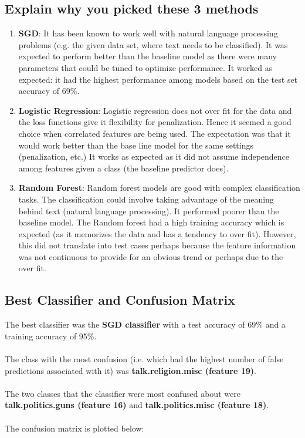 \documentclass[10pt]{article}
\begin{document}
\subsection{Explain why you picked these 3 methods}
\begin{enumerate}
\item \textbf{SGD}: It has been known to work well with natural language processing problems (e.g. the given data set, where text needs to be classified). It was expected to perform better than the baseline model as there were many parameters that could be tuned to optimize performance. It worked as expected: it had the highest performance among models based on the test set accuracy of 69\%.

\item \textbf{Logistic Regression}: Logistic regression does not over fit for the data and the loss functions give it flexibility for penalization. Hence it seemed a good choice when correlated features are being used. The expectation was that it would work better than the base line model for the same settings (penalization, etc.) It works as expected as it did not assume independence among features given a class (the baseline predictor does).

\item \textbf{Random Forest}: Random forest models are good with complex classification tasks. The classification could involve taking advantage of the meaning behind text (natural language processing). It performed poorer than the baseline model. The Random forest had a high training accuracy which is expected (as it memorizes the data and has a tendency to over fit). However, this did not translate into test cases perhaps because the feature information was not continuous to provide for an obvious trend or perhaps due to the over fit.

\end{enumerate}

\pagebreak

\subsection{Best Classifier and Confusion Matrix}

The best classifier was the \textbf{SGD classifier} with a test accuracy of 69\% and a training accuracy of 95\%.
\\ \\
The class with the most confusion (i.e. which had the highest number of false predictions associated with it) was \textbf{talk.religion.misc (feature 19)}.
\\ \\
The two classes that the classifier were most confused about were \textbf{talk.politics.guns (feature 16)} and \textbf{talk.politics.misc (feature 18)}.
\\ \\
The confusion matrix is plotted below: 
\end{document}
